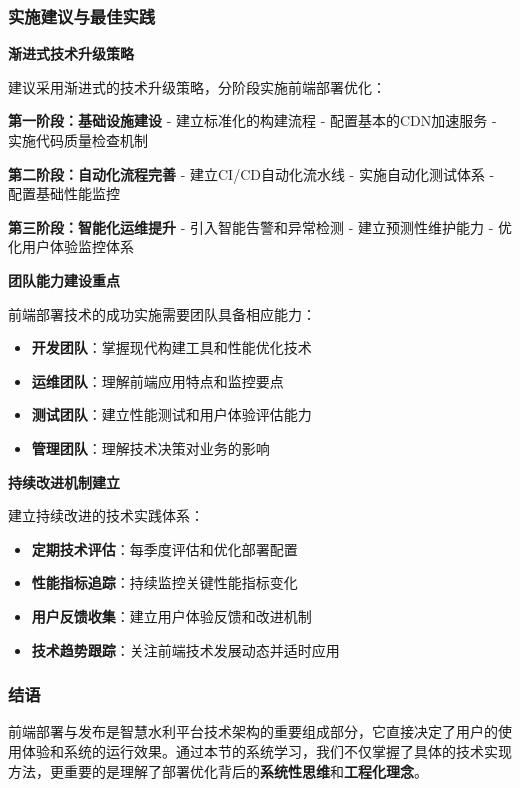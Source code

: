 \subsubsection{实施建议与最佳实践}\label{ux5b9eux65bdux5efaux8baeux4e0eux6700ux4f73ux5b9eux8df5}

\textbf{渐进式技术升级策略}

建议采用渐进式的技术升级策略，分阶段实施前端部署优化：

\textbf{第一阶段：基础设施建设} - 建立标准化的构建流程 - 配置基本的CDN加速服务 - 实施代码质量检查机制

\textbf{第二阶段：自动化流程完善} - 建立CI/CD自动化流水线 - 实施自动化测试体系 - 配置基础性能监控

\textbf{第三阶段：智能化运维提升} - 引入智能告警和异常检测 - 建立预测性维护能力 - 优化用户体验监控体系

\textbf{团队能力建设重点}

前端部署技术的成功实施需要团队具备相应能力：

\begin{itemize}
\tightlist
\item
  \textbf{开发团队}：掌握现代构建工具和性能优化技术
\item
  \textbf{运维团队}：理解前端应用特点和监控要点\\
\item
  \textbf{测试团队}：建立性能测试和用户体验评估能力
\item
  \textbf{管理团队}：理解技术决策对业务的影响
\end{itemize}

\textbf{持续改进机制建立}

建立持续改进的技术实践体系：

\begin{itemize}
\tightlist
\item
  \textbf{定期技术评估}：每季度评估和优化部署配置
\item
  \textbf{性能指标追踪}：持续监控关键性能指标变化
\item
  \textbf{用户反馈收集}：建立用户体验反馈和改进机制
\item
  \textbf{技术趋势跟踪}：关注前端技术发展动态并适时应用
\end{itemize}

\subsubsection{结语}\label{ux7ed3ux8bed-1}

前端部署与发布是智慧水利平台技术架构的重要组成部分，它直接决定了用户的使用体验和系统的运行效果。通过本节的系统学习，我们不仅掌握了具体的技术实现方法，更重要的是理解了部署优化背后的\textbf{系统性思维}和\textbf{工程化理念}。

